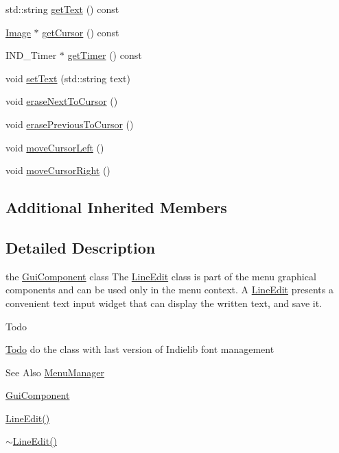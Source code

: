 \begin{DoxyCompactItemize}
\item 
std\-::string \hyperlink{class_symp_1_1_line_edit_a629b33a444f33576093d7fe76bf6fd40}{get\-Text} () const 
\item 
\hyperlink{class_symp_1_1_image}{Image} $\ast$ \hyperlink{class_symp_1_1_line_edit_ab76f79cd92a33d573b88fb1a3d8de905}{get\-Cursor} () const 
\item 
I\-N\-D\-\_\-\-Timer $\ast$ \hyperlink{class_symp_1_1_line_edit_abba8544eeb7029ac07fb46263ccbbf49}{get\-Timer} () const 
\item 
void \hyperlink{class_symp_1_1_line_edit_a3a29ec60c2739eb78f69057fb4caccd3}{set\-Text} (std\-::string text)
\item 
void \hyperlink{class_symp_1_1_line_edit_a277465f59041f7c30ca1688c36db0348}{erase\-Next\-To\-Cursor} ()
\item 
void \hyperlink{class_symp_1_1_line_edit_a2a050cf0268647a6c0e9fff0a4acc1b6}{erase\-Previous\-To\-Cursor} ()
\item 
void \hyperlink{class_symp_1_1_line_edit_a41cceecfc3b0b6b946166b8212b14c8e}{move\-Cursor\-Left} ()
\item 
void \hyperlink{class_symp_1_1_line_edit_a37267fddcdd9505a03a2350ac09f22cb}{move\-Cursor\-Right} ()
\end{DoxyCompactItemize}
\subsection*{Additional Inherited Members}


\subsection{Detailed Description}
the \hyperlink{class_symp_1_1_gui_component_a22124675c2976983ac18374f81cc3fb3}{Gui\-Component} class The \hyperlink{class_symp_1_1_line_edit_aa712aa773e905c7e15f52825006ec65a}{Line\-Edit} class is part of the menu graphical components and can be used only in the menu context. A \hyperlink{class_symp_1_1_line_edit_aa712aa773e905c7e15f52825006ec65a}{Line\-Edit} presents a convenient text input widget that can display the written text, and save it. \begin{DoxyRefDesc}{Todo}
\item[\hyperlink{todo__todo000001}{Todo}]do the class with last version of Indielib font management \end{DoxyRefDesc}
\begin{DoxySeeAlso}{See Also}
\hyperlink{class_symp_1_1_menu_manager}{Menu\-Manager} 

\hyperlink{class_symp_1_1_gui_component}{Gui\-Component} 

\hyperlink{class_symp_1_1_line_edit_aa712aa773e905c7e15f52825006ec65a}{Line\-Edit()} 

\hyperlink{class_symp_1_1_line_edit_abf14f4506d3824a3facf759862cafd92}{$\sim$\-Line\-Edit()} 
\end{DoxySeeAlso}



